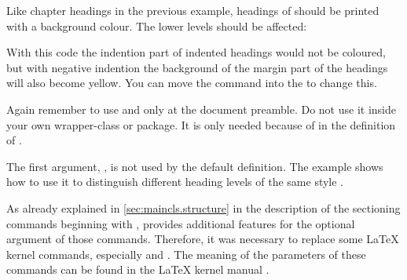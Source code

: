\begin{Example}
  Like chapter headings in the previous example, headings of 
   should be printed with a background colour. The lower
  levels should be affected:
\begin{lstcode}
  \makeatletter
  \renewcommand{\sectionlinesformat}[4]{%
    \@tempswafalse
    \ifstr{#1}{section}{%
      \hspace*{#2}%
      \colorbox{yellow}{%
        \parbox{\dimexpr\linewidth-2\fboxrule-2\fboxsep-#2}{%
          \raggedsection
          \@hangfrom{#3}{#4}%
        }%
      }%
    }{%
      \@hangfrom{\hskip #2#3}{#4}%
    }%
  }
  \makeatother
\end{lstcode}
  With this code the indention part of indented headings would not be
  coloured, but with negative indention the background of the margin part of
  the headings will also become yellow. You can move the 
  command into the  to change this.

  Again remember to use  and  only at the
  document preamble. Do not use it inside your own wrapper-class or
  package. It is only needed because of  in the definition of
  .
\end{Example}

The first argument, , is not used by the default definition. The
example shows how to use it to distinguish different heading levels of the
same style .%
\EndIndexGroup


\begin{Declaration}
                          \PValue{*}%
\end{Declaration}
As already explained in \autoref{sec:maincls.structure} in
the description of the sectioning commands beginning with
, \KOMAScript{} provides additional
features for the optional argument of those commands. Therefore, it was
necessary to replace some \LaTeX{} kernel commands, especially 
 and
%
. The meaning of the parameters of these
commands can be found in the \LaTeX{} kernel manual \cite{latex:source2e}.

